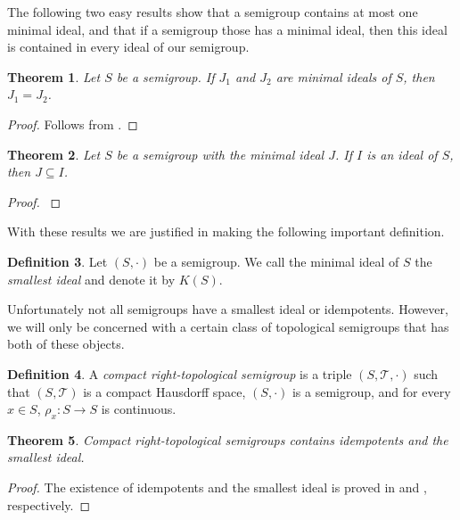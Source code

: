 \documentclass[12pt]{article}
\theoremstyle{plain}
\newtheorem{thm}{Theorem}[section]
\theoremstyle{definition}
\newtheorem{defn}[thm]{Definition}
\newcommand{\calT}{\mathcal{T}}
\begin{document}
The following two easy results show that a semigroup contains at most one minimal ideal, and that if a semigroup those has a minimal ideal, then this ideal is contained in every ideal of our semigroup.

\begin{thm}
  Let $S$ be a semigroup.
  If $J_1$ and $J_2$ are minimal ideals of $S$, then $J_1 = J_2$.
\end{thm}
\begin{proof}
  Follows from \cite[Lemma 1.29]{Hindman:1998fk}.
\end{proof}
\begin{thm}
  Let $S$ be a semigroup with the minimal ideal $J$. 
  If $I$ is an ideal of $S$, then $J \subseteq I$.
\end{thm}
\begin{proof}
  \cite[Lemma 1.49]{Hindman:1998fk}
\end{proof}

With these results we are justified in making the following important definition.
\begin{defn}
  Let $(S,\cdot)$ be a semigroup. 
  We call the minimal ideal of $S$ the \textsl{smallest ideal} and denote it by $K(S)$.%
\end{defn}
Unfortunately not all semigroups have a smallest ideal or idempotents. 
However, we will only be concerned with a certain class of topological semigroups that has both of these objects.

\begin{defn}
  A \textsl{compact right-topological semigroup} is a triple $(S,\calT, \cdot)$ such that $(S, \calT)$ is a compact Hausdorff space, $(S, \cdot)$ is a semigroup, and for every $x \in S$, $\rho_x \colon S \to S$ is continuous. 
\end{defn}

\begin{thm}
  Compact right-topological semigroups contains idempotents and the smallest ideal.
\end{thm}
\begin{proof}
  The existence of idempotents and the smallest ideal is proved in \cite[Theorem 2.5]{Hindman:1998fk} and \cite[Theorem 2.8]{Hindman:1998fk}, respectively.
\end{proof}
\end{document}
